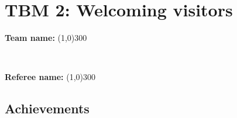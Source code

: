 \section*{TBM 2: Welcoming visitors}
\vspace{0.1cm} \begin{large} \textbf{Team name:} \line(1,0){300} \end{large} \vspace{0.7cm} \\ 
\vspace{0.1cm} \begin{large} \textbf{Referee name:} \line(1,0){300} \end{large}

\subsection*{Achievements}
